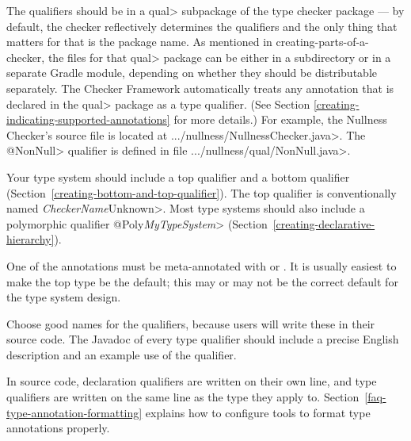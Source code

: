 The qualifiers should be in a \<qual> subpackage of the type checker package ---
by default, the checker reflectively determines the qualifiers and the only thing that matters for that is the package name.
As mentioned in {creating-parts-of-a-checker}, the files for that \<qual> package can be
either in a subdirectory or in a separate Gradle module, depending on whether
they should be distributable separately.
The Checker Framework automatically treats any annotation that
is declared in the \<qual> package as a type qualifier.
(See Section \ref{creating-indicating-supported-annotations} for more details.)
For example, the Nullness Checker's source file is located at
\<.../nullness/NullnessChecker.java>. The \<@NonNull> qualifier is defined in
file \<.../nullness/qual/NonNull.java>.


Your type system should include a top qualifier and a bottom qualifier
(Section~\ref{creating-bottom-and-top-qualifier}).
The top qualifier is conventionally named \<\emph{CheckerName}Unknown>.
Most type systems should also include a
polymorphic qualifier \<@Poly\emph{MyTypeSystem}>
(Section~\ref{creating-declarative-hierarchy}).

One of the annotations must be meta-annotated with
 or
.
It is usually easiest to make the top type be the default; this may or may
not be the correct default for the type system design.

Choose good names for the qualifiers, because users will write these in
their source code.
The Javadoc of every type qualifier should include a precise English
description and an example use of the qualifier.

In source code, declaration qualifiers are written on their own line, and
type qualifiers are written on the same line as the type they apply to.
Section~\ref{faq-type-annotation-formatting} explains how to configure
tools to format type annotations properly.



